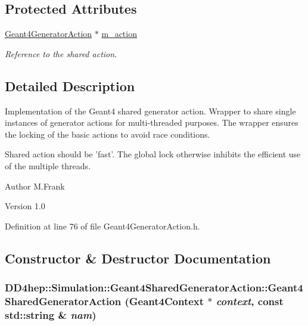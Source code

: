 \subsection*{Protected Attributes}
\begin{DoxyCompactItemize}
\item 
\hyperlink{class_d_d4hep_1_1_simulation_1_1_geant4_generator_action}{Geant4GeneratorAction} $\ast$ \hyperlink{class_d_d4hep_1_1_simulation_1_1_geant4_shared_generator_action_ac161fab3e1f99c7dc5a8555bacb904a2}{m\_\-action}
\begin{DoxyCompactList}\small\item\em Reference to the shared action. \item\end{DoxyCompactList}\end{DoxyCompactItemize}


\subsection{Detailed Description}
Implementation of the Geant4 shared generator action. Wrapper to share single instances of generator actions for multi-\/threaded purposes. The wrapper ensures the locking of the basic actions to avoid race conditions.

Shared action should be 'fast'. The global lock otherwise inhibits the efficient use of the multiple threads.

\begin{DoxyAuthor}{Author}
M.Frank 
\end{DoxyAuthor}
\begin{DoxyVersion}{Version}
1.0 
\end{DoxyVersion}


Definition at line 76 of file Geant4GeneratorAction.h.

\subsection{Constructor \& Destructor Documentation}
\hypertarget{class_d_d4hep_1_1_simulation_1_1_geant4_shared_generator_action_a85a710a23ad60659956e4d8cba887b45}{
\subsubsection[{Geant4SharedGeneratorAction}]{\setlength{\rightskip}{0pt plus 5cm}DD4hep::Simulation::Geant4SharedGeneratorAction::Geant4SharedGeneratorAction ({\bf Geant4Context} $\ast$ {\em context}, \/  const std::string \& {\em nam})}}
\label{class_d_d4hep_1_1_simulation_1_1_geant4_shared_generator_action_a85a710a23ad60659956e4d8cba887b45}


